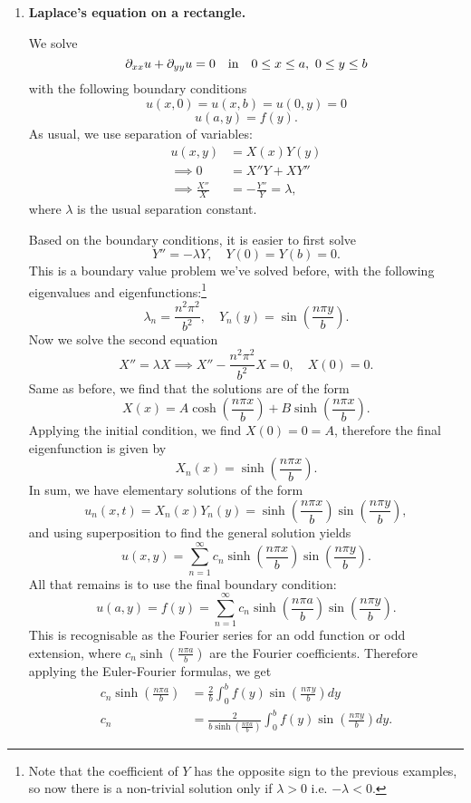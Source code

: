\begin{enumerate}
	\item \textbf{Laplace's equation on a rectangle.}
	
	We solve
	\[
	\partial_{xx}u + \partial_{yy}u = 0 \quad \text{in} \quad 0 \leq x \leq a, \,\, 0 \leq y \leq b
	\]
	with the following boundary conditions
	\[
	u(x,0) = u(x,b) = u(0,y) = 0
	\]
	\[
	u(a,y) = f(y).
	\]
	As usual, we use separation of variables:
	\begin{align*}
		u(x,y) &= X(x)Y(y) \\
		\implies 0 &= X''Y + XY''\\
		\implies \frac{X''}{X} &= -\frac{Y''}{Y} = \lambda,
	\end{align*}
	where $\lambda$ is the usual separation constant.
	
	Based on the boundary conditions, it is easier to first solve
	\[
	Y'' = -\lambda Y, \quad Y(0) = Y(b) = 0.
	\]
	This is a boundary value problem we've solved before, with the following eigenvalues and eigenfunctions:\footnote{Note that the coefficient of $Y$ has the opposite sign to the previous examples, so now there is a non-trivial solution only if $\lambda>0$ i.e. $-\lambda<0$.}
	\[
	\lambda_n = \frac{n^2\pi^2}{b^2}, \quad Y_n(y) = \sin\left(\frac{n\pi y}{b}\right).
	\]
	Now we solve the second equation
	\[
	X'' = \lambda X \implies X'' - \frac{n^2\pi^2}{b^2}X = 0, \quad X(0)=0.
	\]
	Same as before, we find that the solutions are of the form
	\[
	X(x) = A\cosh\left(\frac{n\pi x}{b}\right) + B\sinh\left(\frac{n\pi x}{b}\right).
	\]
	Applying the initial condition, we find $X(0) = 0 = A$, therefore the final eigenfunction is given by
	\[
	X_n(x) = \sinh\left(\frac{n\pi x}{b}\right).
	\]
	In sum, we have elementary solutions of the form
	\[
	u_n(x,t) = X_n(x) Y_n(y) = \sinh\left(\frac{n\pi x}{b}\right) \sin\left(\frac{n\pi y}{b}\right),
	\]
	and using superposition to find the general solution yields
	\begin{equation}
		u(x,y) = \sum_{n=1}^{\infty} c_n \sinh\left(\frac{n\pi x}{b}\right) \sin\left(\frac{n\pi y}{b}\right).
	\end{equation}
	All that remains is to use the final boundary condition:
	\[
	u(a,y) = f(y) = \sum_{n=1}^{\infty} c_n \sinh\left(\frac{n\pi a}{b}\right) \sin\left(\frac{n\pi y}{b}\right).
	\]
	This is recognisable as the Fourier series for an odd function or odd extension, where $c_n \sinh\left(\frac{n\pi a}{b}\right)$ are the Fourier coefficients. Therefore applying the Euler-Fourier formulas, we get
	\begin{align}
		c_n \sinh\left(\frac{n\pi a}{b}\right) &= \frac{2}{b} \int_0^b f(y)\sin\left(\frac{n\pi y}{b}\right)dy \nonumber \\
		c_n &= \frac{2}{b\sinh\left(\frac{n\pi a}{b}\right)} \int_0^b f(y)\sin\left(\frac{n\pi y}{b}\right)dy.
	\end{align}
	

\end{enumerate}
